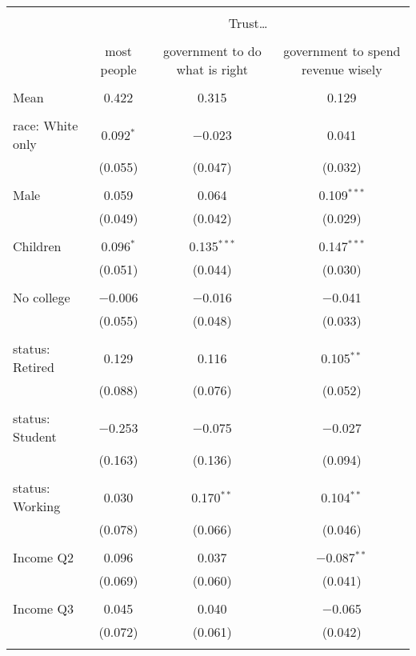 
\begin{tabular}{@{\extracolsep{5pt}}lccc} 
\\[-1.8ex]\hline 
\hline \\[-1.8ex] 
 & \multicolumn{3}{c}{Trust…} \\ 
\cline{2-4} 
\\[-1.8ex] & most people & government to do what is right & government to spend revenue wisely \\ 
\hline \\[-1.8ex] 
 Mean & 0.422 & 0.315 & 0.129  \\ \hline \\[-1.8ex] race: White only & 0.092$^{*}$ & $-$0.023 & 0.041 \\ 
  & (0.055) & (0.047) & (0.032) \\ 
  & & & \\ 
 Male & 0.059 & 0.064 & 0.109$^{***}$ \\ 
  & (0.049) & (0.042) & (0.029) \\ 
  & & & \\ 
 Children & 0.096$^{*}$ & 0.135$^{***}$ & 0.147$^{***}$ \\ 
  & (0.051) & (0.044) & (0.030) \\ 
  & & & \\ 
 No college & $-$0.006 & $-$0.016 & $-$0.041 \\ 
  & (0.055) & (0.048) & (0.033) \\ 
  & & & \\ 
 status: Retired & 0.129 & 0.116 & 0.105$^{**}$ \\ 
  & (0.088) & (0.076) & (0.052) \\ 
  & & & \\ 
 status: Student & $-$0.253 & $-$0.075 & $-$0.027 \\ 
  & (0.163) & (0.136) & (0.094) \\ 
  & & & \\ 
 status: Working & 0.030 & 0.170$^{**}$ & 0.104$^{**}$ \\ 
  & (0.078) & (0.066) & (0.046) \\ 
  & & & \\ 
 Income Q2 & 0.096 & 0.037 & $-$0.087$^{**}$ \\ 
  & (0.069) & (0.060) & (0.041) \\ 
  & & & \\ 
 Income Q3 & 0.045 & 0.040 & $-$0.065 \\ 
  & (0.072) & (0.061) & (0.042) \\ 
  & & & \\ 

\end{tabular}
